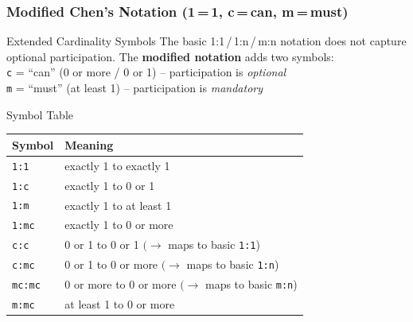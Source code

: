 \begin{frame}
  \frametitle{Modified Chen's Notation (1\,=\,1,\; c\,=\,can,\; m\,=\,must)}

  \begin{block}{Extended Cardinality Symbols}
    The basic 1:1\,/\,1:n\,/\,m:n notation does not capture optional participation. The \textbf{modified notation} adds two symbols:\\[0.3em]
    \texttt{c} = ``can'' (0 or more / 0 or 1) \quad -- participation is \textit{optional}\\
    \texttt{m} = ``must'' (at least 1) \quad\qquad\quad -- participation is \textit{mandatory}
  \end{block}

  \begin{block}{Symbol Table}
    \renewcommand{\arraystretch}{1.25}
    \begin{tabular}{@{}ll@{}}
      \toprule
      \textbf{Symbol} & \textbf{Meaning} \\
      \midrule
      \texttt{1:1}   & exactly 1 to exactly 1 \\
      \texttt{1:c}   & exactly 1 to 0 or 1 \\
      \texttt{1:m}   & exactly 1 to at least 1 \\
      \texttt{1:mc}  & exactly 1 to 0 or more \\
      \texttt{c:c}   & 0 or 1 to 0 or 1 \quad $(\to$ maps to basic \texttt{1:1}) \\
      \texttt{c:mc}  & 0 or 1 to 0 or more \quad $(\to$ maps to basic \texttt{1:n}) \\
      \texttt{mc:mc} & 0 or more to 0 or more \quad $(\to$ maps to basic \texttt{m:n}) \\
      \texttt{m:mc}  & at least 1 to 0 or more \\
      \bottomrule
    \end{tabular}
  \end{block}
\end{frame}

